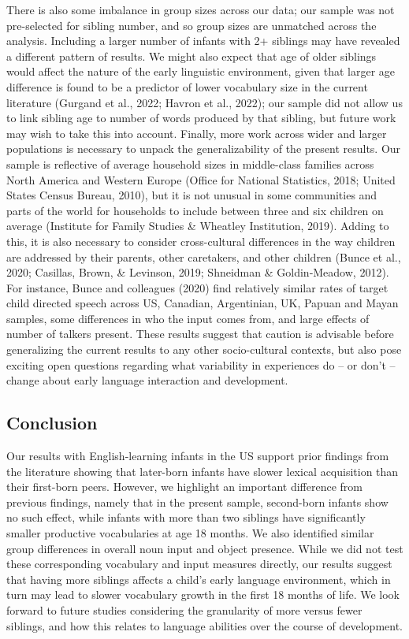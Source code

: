 \documentclass[
  man,mask,floatsintext]{apa6}
\begin{document}
There is also some imbalance in group sizes across our data; our sample was not pre-selected for sibling number, and so group sizes are unmatched across the analysis. Including a larger number of infants with 2+ siblings may have revealed a different pattern of results. We might also expect that age of older siblings would affect the nature of the early linguistic environment, given that larger age difference is found to be a predictor of lower vocabulary size in the current literature (Gurgand et al., 2022; Havron et al., 2022); our sample did not allow us to link sibling age to number of words produced by that sibling, but future work may wish to take this into account. Finally, more work across wider and larger populations is necessary to unpack the generalizability of the present results. Our sample is reflective of average household sizes in middle-class families across North America and Western Europe (Office for National Statistics, 2018; United States Census Bureau, 2010), but it is not unusual in some communities and parts of the world for households to include between three and six children on average (Institute for Family Studies \& Wheatley Institution, 2019). Adding to this, it is also necessary to consider cross-cultural differences in the way children are addressed by their parents, other caretakers, and other children (Bunce et al., 2020; Casillas, Brown, \& Levinson, 2019; Shneidman \& Goldin‐Meadow, 2012). For instance, Bunce and colleagues (2020) find relatively similar rates of target child directed speech across US, Canadian, Argentinian, UK, Papuan and Mayan samples, some differences in who the input comes from, and large effects of number of talkers present. These results suggest that caution is advisable before generalizing the current results to any other socio-cultural contexts, but also pose exciting open questions regarding what variability in experiences do -- or don't -- change about early language interaction and development.

\hypertarget{conclusion}{%
\subsection{Conclusion}\label{conclusion}}

Our results with English-learning infants in the US support prior findings from the literature showing that later-born infants have slower lexical acquisition than their first-born peers. However, we highlight an important difference from previous findings, namely that in the present sample, second-born infants show no such effect, while infants with more than two siblings have significantly smaller productive vocabularies at age 18 months. We also identified similar group differences in overall noun input and object presence. While we did not test these corresponding vocabulary and input measures directly, our results suggest that having more siblings affects a child's early language environment, which in turn may lead to slower vocabulary growth in the first 18 months of life. We look forward to future studies considering the granularity of more versus fewer siblings, and how this relates to language abilities over the course of development.
\end{document}
